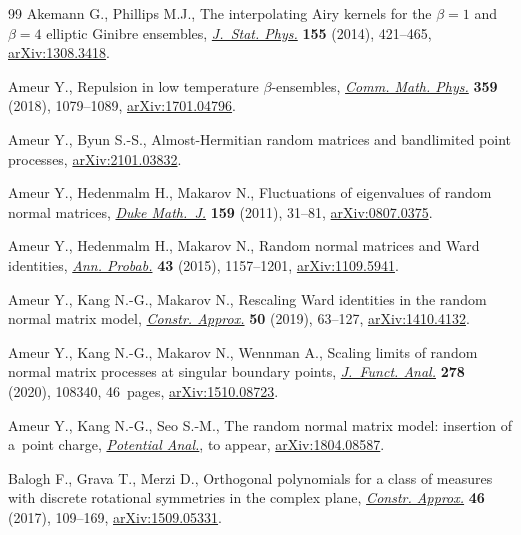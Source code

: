 \documentclass[pdftex]{sigma}
\numberwithin{equation}{section}
\newcommand{\1}{\chi}
\begin{document}
\begin{thebibliography}{99}
Akemann G., Phillips M.J., The interpolating {A}iry kernels for the {$\beta=1$}
 and {$\beta=4$} elliptic {G}inibre ensembles, \href{https://doi.org/10.1007/s10955-014-0962-6}{\textit{J.~Stat. Phys.}}
 \textbf{155} (2014), 421--465, \href{https://arxiv.org/abs/1308.3418}{arXiv:1308.3418}.

Ameur Y., Repulsion in low temperature {$\beta$}-ensembles, \href{https://doi.org/10.1007/s00220-017-3027-2}{\textit{Comm. Math.
 Phys.}} \textbf{359} (2018), 1079--1089, \href{https://arxiv.org/abs/1701.04796}{arXiv:1701.04796}.

Ameur Y., Byun S.-S., Almost-{H}ermitian random matrices and bandlimited point
 processes, \href{https://arxiv.org/abs/2101.03832}{arXiv:2101.03832}.

Ameur Y., Hedenmalm H., Makarov N., Fluctuations of eigenvalues of random
 normal matrices, \href{https://doi.org/10.1215/00127094-1384782}{\textit{Duke Math.~J.}} \textbf{159} (2011), 31--81,
 \href{https://arxiv.org/abs/0807.0375}{arXiv:0807.0375}.

Ameur Y., Hedenmalm H., Makarov N., Random normal matrices and {W}ard
 identities, \href{https://doi.org/10.1214/13-AOP885}{\textit{Ann. Probab.}} \textbf{43} (2015), 1157--1201,
 \href{https://arxiv.org/abs/1109.5941}{arXiv:1109.5941}.

Ameur Y., Kang N.-G., Makarov N., Rescaling {W}ard identities in the random
 normal matrix model, \href{https://doi.org/10.1007/s00365-018-9423-9}{\textit{Constr. Approx.}} \textbf{50} (2019), 63--127,
 \href{https://arxiv.org/abs/1410.4132}{arXiv:1410.4132}.

Ameur Y., Kang N.-G., Makarov N., Wennman A., Scaling limits of random normal
 matrix processes at singular boundary points, \href{https://doi.org/10.1016/j.jfa.2019.108340}{\textit{J.~Funct. Anal.}}
 \textbf{278} (2020), 108340, 46~pages, \href{https://arxiv.org/abs/1510.08723}{arXiv:1510.08723}.

Ameur Y., Kang N.-G., Seo S.-M., The random normal matrix model: insertion of
 a~point charge, \href{https://doi.org/10.1007/s11118-021-09942-z}{\textit{Potential Anal.}}, {t}o appear, \href{https://arxiv.org/abs/1804.08587}{arXiv:1804.08587}.

Balogh F., Grava T., Merzi D., Orthogonal polynomials for a class of measures
 with discrete rotational symmetries in the complex plane, \href{https://doi.org/10.1007/s00365-016-9356-0}{\textit{Constr.
 Approx.}} \textbf{46} (2017), 109--169, \href{https://arxiv.org/abs/1509.05331}{arXiv:1509.05331}.


\end{thebibliography}
\end{document}
